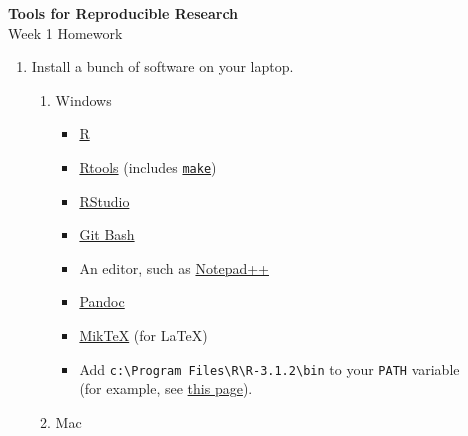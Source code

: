 \documentclass[12pt]{article}
\newcommand{\ttsm}{\tt \small}
\begin{document}
\thispagestyle{empty}

\textbf{Tools for Reproducible Research} \\
Week 1 Homework

\bigskip

\begin{enumerate}
%

\item Install a bunch of software on your laptop.

  \begin{enumerate}
  \item Windows

    \begin{itemize}
    \item \href{http://cran.rstudio.com/bin/windows/base/}{R}
    \item \href{http://cran.rstudio.com/bin/windows/Rtools/Rtools32.exe}{Rtools}
      (includes \href{http://www.gnu.org/software/make/}{\ttsm make})
    \item \href{http://www.rstudio.com/products/rstudio/download/}{RStudio}
    \item \href{http://msysgit.github.io/}{Git Bash}
    \item An editor, such as \href{http://notepad-plus-plus.org/download}{Notepad++}
    \item \href{http://johnmacfarlane.net/pandoc/installing.html}{Pandoc}
    \item \href{http://miktex.org/download}{MikTeX} (for LaTeX)
    \item Add {\ttsm c:{\textbackslash}Program Files{\textbackslash}R{\textbackslash}R-3.1.2{\textbackslash}bin}
      to your {\ttsm PATH} variable \\
      (for example, see \href{http://www.howtogeek.com/118594/how-to-edit-your-system-path-for-easy-command-line-access/}{this page}).
    \end{itemize}


  \item Mac


\end{enumerate}
\end{enumerate}
\end{document}
